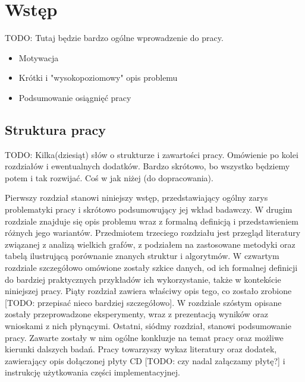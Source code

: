 \chapter{Wstęp}

TODO: Tutaj będzie bardzo ogólne wprowadzenie do pracy.
\begin{itemize}
    \item Motywacja
    \item Krótki i "wysokopoziomowy" opis problemu
    \item Podsumowanie osiągnięć pracy
\end{itemize}

\section{Struktura pracy}
TODO: Kilka(dziesiąt) słów o strukturze i zawartości pracy. Omówienie po kolei rozdziałów i ewentualnych dodatków. Bardzo skrótowo, bo wszystko będziemy potem  i tak rozwijać. Coś w jak niżej (do dopracowania).

Pierwszy rozdział stanowi niniejszy wstęp, przedstawiający ogólny zarys problematyki pracy i skrótowo podsumowujący jej wkład badawczy. W drugim rozdziale znajduje się opis problemu wraz z formalną definicją i przedstawieniem różnych jego wariantów. Przedmiotem trzeciego rozdziału jest przegląd literatury związanej z analizą wielkich grafów, z podziałem na zastosowane metodyki oraz tabelą ilustrującą porównanie znanych struktur i algorytmów.  W czwartym rozdziale szczegółowo omówione zostały szkice danych, od ich formalnej definicji do bardziej praktycznych przykładów ich wykorzystanie, także w kontekście niniejszej pracy. Piąty rozdział zawiera właściwy opis tego, co zostało zrobione [TODO: przepisać nieco bardziej szczegółowo]. W rozdziale szóstym opisane zostały przeprowadzone eksperymenty, wraz z prezentacją wyników oraz wnioskami z nich płynącymi. Ostatni, siódmy rozdział, stanowi podsumowanie pracy. Zawarte zostały w nim ogólne konkluzje na temat pracy oraz możliwe kierunki dalszych badań. Pracy towarzyszy wykaz literatury oraz dodatek, zawierający opis dołączonej płyty CD [TODO: czy nadal załączamy płytę?] i instrukcję użytkowania części implementacyjnej. 